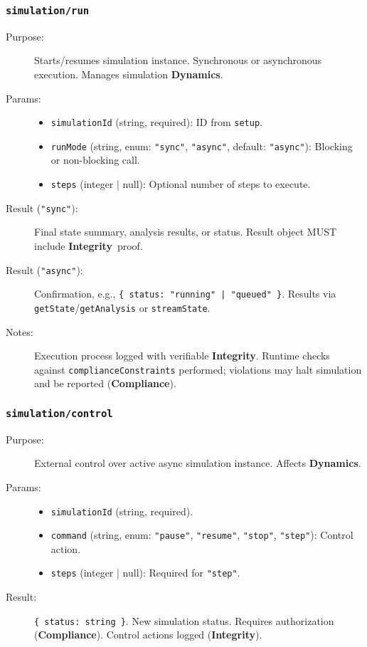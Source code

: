 \documentclass[12pt,a4paper]{report}
\newcommand{\Integrity}{\textbf{Integrity}}
\newcommand{\Dynamics}{\textbf{Dynamics}}
\begin{document}
	\subsubsection{\texttt{simulation/run}}
	\label{app:oasim_sim_run}
	\begin{description}
		\item[Purpose:] Starts/resumes simulation instance. Synchronous or asynchronous execution. Manages simulation \Dynamics.
		\item[Params:]
		\begin{itemize} \itemsep0em
			\item \texttt{simulationId} (string, required): ID from \texttt{setup}.
			\item \texttt{runMode} (string, enum: \texttt{"sync"}, \texttt{"async"}, default: \texttt{"async"}): Blocking or non-blocking call.
			\item \texttt{steps} (integer | null): Optional number of steps to execute.
		\end{itemize}
		\item[Result (\texttt{"sync"}):] Final state summary, analysis results, or status. Result object MUST include \Integrity\ proof.
		\item[Result (\texttt{"async"}):] Confirmation, e.g., \texttt{\{ status: "running" | "queued" \}}. Results via \texttt{getState}/\texttt{getAnalysis} or \texttt{streamState}.
		\item[Notes:] Execution process logged with verifiable \Integrity. Runtime checks against \texttt{complianceConstraints} performed; violations may halt simulation and be reported (\textbf{Compliance}).
	\end{description}
	
	\subsubsection{\texttt{simulation/control}}
	\label{app:oasim_sim_control}
	\begin{description}
		\item[Purpose:] External control over active async simulation instance. Affects \Dynamics.
		\item[Params:]
		\begin{itemize} \itemsep0em
			\item \texttt{simulationId} (string, required).
			\item \texttt{command} (string, enum: \texttt{"pause"}, \texttt{"resume"}, \texttt{"stop"}, \texttt{"step"}): Control action.
			\item \texttt{steps} (integer | null): Required for \texttt{"step"}.
		\end{itemize}
		\item[Result:] \texttt{\{ status: string \}}. New simulation status. Requires authorization (\textbf{Compliance}). Control actions logged (\Integrity).
	\end{description}
	
\end{document}
